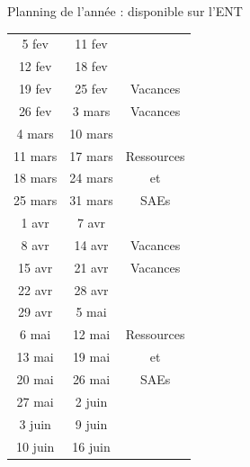 \documentclass [xcolor=x11names,t] {beamer}
\begin{document}
\begin{frame}{Planning de l'année : disponible sur l'ENT}
\begin{minipage}{0.45\textwidth}
\begin{tabular}{|c|c|c|}
	5 fev & 11 fev& \\ \cline{1-2}
	12 fev &  18 fev&  \\ \hline
	\cellcolor{green!30}19 fev & \cellcolor{green!30}25 fev& \cellcolor{green!30}Vacances \\ \hline
	\cellcolor{green!30}26 fev & \cellcolor{green!30}3 mars&  \cellcolor{green!30}Vacances \\ \hline
	4 mars&   10 mars&  \\ \cline{1-2}
	11 mars&  17 mars&  Ressources \\\cline{1-2}
	18 mars&  24 mars&  et\\ \cline{1-2}
	25 mars&  31 mars&  SAEs\\ \cline{1-2}
	1 avr& 7 avr&  \\ \hline
	\cellcolor{green!30}8 avr&\cellcolor{green!30} 14 avr& \cellcolor{green!30} Vacances\\ \hline
	\cellcolor{green!30}15 avr& \cellcolor{green!30}21 avr&\cellcolor{green!30} Vacances \\ \hline
	22 avr& 28 avr&  \\ \cline{1-2}
	29 avr& 5 mai&  \\ \cline{1-2}
	6 mai& 12 mai&  Ressources\\ \cline{1-2}
	13 mai& 19 mai& et \\ \cline{1-2}
	20 mai& 26 mai&  SAEs \\ \cline{1-2}
	27 mai&  2 juin&   \\ \cline{1-2}
	3 juin&  9 juin&  \\ \cline{1-2}
	10 juin&  16 juin& \\ \hline
\end{tabular}
\end{minipage}
\end{frame}
\end{document}
